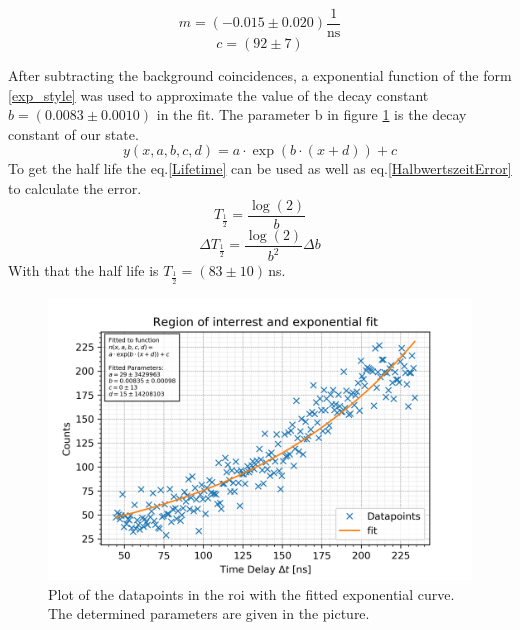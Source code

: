 \documentclass[30pt,a4paper]{article}
\begin{document}
 	\begin{equation*}
 	m = (-0.015 \pm 0.020)\frac{1}{\textrm{ns}}
 	\end{equation*}
 	$$c = (92 \pm 7)$$
 	
 	
 	
 
 	
 	\FloatBarrier
 	After subtracting the background coincidences, a exponential function of the form
 	\ref{exp_style} was used to approximate the value of the decay constant $b=(0.0083\pm0.0010)$ in the fit. The parameter b in figure \ref{exp_fit} is the decay constant of our state. 
 	\begin{equation}
 	y\left(x,a,b,c,d\right) = a \cdot \exp\left(b\cdot\left(x+d\right)\right) + c
 	\label{exp_style}
 	\end{equation}
 	To get the half life the eq.\ref{Lifetime} can be used as well as eq.\ref{HalbwertszeitError} to calculate the error.
 	\begin{equation}
 	T_\frac{1}{2}=\frac{\log(2)}{b}
 	\label{Lifetime} 
 	\end{equation}
 	\begin{equation}
 	\Delta T_\frac{1}{2}=\frac{\log(2)}{b^2}\Delta b
 	\label{HalbwertszeitError} 
 	\end{equation}
 	With that the half life is $T_\frac{1}{2}=(83\pm10)$\,ns.
 	\begin{figure}[h]
 		\includegraphics{Bilder/lin_fit_exp}
 		\centering
 		\caption[Exponential Fit of the Decay]{\small Plot of the datapoints in the roi with the fitted exponential curve. The determined parameters are given in the picture.}
 		\label{exp_fit}
 	\end{figure}
\end{document}
